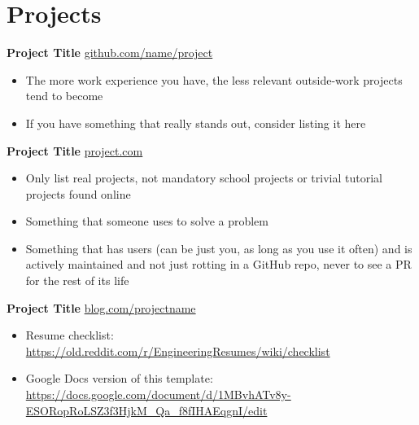 \documentclass[11pt]{article}       %
\begin{document}
\vspace{-18.5pt}

\section*{Projects}
\textbf{Project Title} \hfill \href{https://github.com/matiassingers/awesome-readme}{github.com/name/project} \\
\vspace{-9pt}
\begin{itemize}
  \item The more work experience you have, the less relevant outside-work projects tend to become
  \item If you have something that really stands out, consider listing it here
\end{itemize}

\textbf{Project Title} \hfill \href{https://mitcommlab.mit.edu/meche/commkit/portfolio/}{project.com} \\
\vspace{-9pt}
\begin{itemize}
  \item Only list real projects, not mandatory school projects or trivial tutorial projects found online 
  \item Something that someone uses to solve a problem
  \item Something that has users (can be just you, as long as you use it often) and is actively maintained and not just rotting in a GitHub repo, never to see a PR for the rest of its life
\end{itemize}

\textbf{Project Title} \hfill \href{https://www.hardwareishard.net/portfolio-database}{blog.com/projectname} \\
\vspace{-9pt}
\begin{itemize}
  \item Resume checklist: \url{https://old.reddit.com/r/EngineeringResumes/wiki/checklist}
  \item Google Docs version of this template: \url{https://docs.google.com/document/d/1MBvhATv8y-ESORopRoLSZ3f3HjkM_Qa_f8fIHAEqgnI/edit}
\end{itemize}
\end{document}
